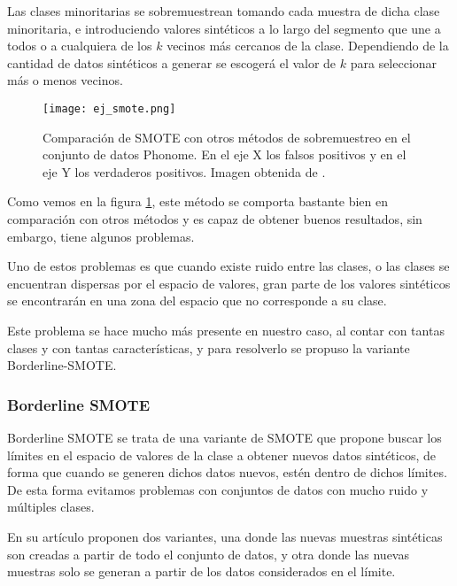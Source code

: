 Las clases minoritarias se sobremuestrean tomando cada muestra de dicha clase minoritaria, e introduciendo valores sintéticos a lo largo del segmento que une a todos o a cualquiera de los $k$ vecinos más cercanos de la clase. Dependiendo de la cantidad de datos sintéticos a generar se escogerá el valor de $k$ para seleccionar más o menos vecinos.


\begin{figure}[H]
	\centering
	\texttt{[image: ej\_smote.png]}
	\caption{Comparación de SMOTE con otros métodos de sobremuestreo en el conjunto de datos Phonome. En el eje X los falsos positivos y en el eje Y los verdaderos positivos. Imagen obtenida de \cite{SMOTE}.}
	\label{fig:comparacionSMOTE}
\end{figure}

Como vemos en la figura \ref{fig:comparacionSMOTE}, este método se comporta bastante bien en comparación con otros métodos y es capaz de obtener buenos resultados, sin embargo, tiene algunos problemas.

Uno de estos problemas es que cuando existe ruido entre las clases, o las clases se encuentran dispersas por el espacio de valores, gran parte de los valores sintéticos se encontrarán en una zona del espacio que no corresponde a su clase.

Este problema se hace mucho más presente en nuestro caso, al contar con tantas clases y con tantas características, y para resolverlo se propuso la variante Borderline-SMOTE.

\subsubsection{Borderline SMOTE}


Borderline SMOTE \cite{BL-SMOTE} se trata de una variante de SMOTE que propone buscar los límites en el espacio de valores de la clase a obtener nuevos datos sintéticos, de forma que cuando se generen dichos datos nuevos, estén dentro de dichos límites. De esta forma evitamos problemas con conjuntos de datos con mucho ruido y múltiples clases.

En su artículo proponen dos variantes, una donde las nuevas muestras sintéticas son creadas a partir de todo el conjunto de datos, y otra donde las nuevas muestras solo se generan a partir de los datos considerados en el límite.


